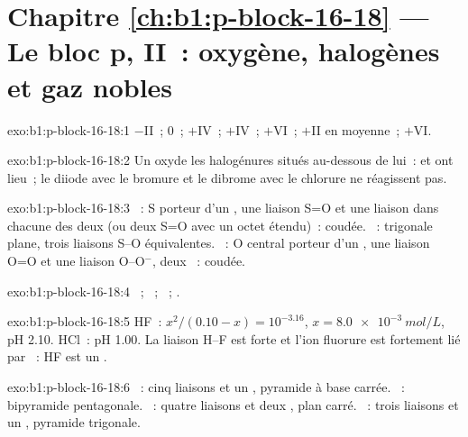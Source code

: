 \section*{Chapitre \ref{ch:b1:p-block-16-18} --- Le bloc p, II~: oxygène, halogènes et gaz nobles}

\begin{solution}{exo:b1:p-block-16-18:1}
 $-$II~;  0~;  $+$IV~;  $+$IV~; 
$+$VI~;  $+$II en moyenne~;  $+$VI.
\end{solution}

\begin{solution}{exo:b1:p-block-16-18:2}
Un  oxyde les halogénures situés au-dessous de lui~:
 et
 ont lieu~; le diiode avec le bromure et le
dibrome avec le chlorure ne réagissent pas.
\end{solution}

\begin{solution}{exo:b1:p-block-16-18:3}
~: S porteur d'un , une liaison S=O et une
liaison  dans chacune des deux  (ou deux
S=O avec un octet étendu)~: coudée.
~: trigonale plane, trois liaisons S--O équivalentes. ~:
O central porteur d'un , une liaison O=O et une liaison
O--O$^-$, deux ~: coudée.
\end{solution}

\begin{solution}{exo:b1:p-block-16-18:4}
~; ~;
~; .
\end{solution}

\begin{solution}{exo:b1:p-block-16-18:5}
HF~: $x^2/(0.10 - x) = 10^{-3.16}$, $x = \qty{8.0e-3}{mol/L}$, pH 2.10.
HCl~:
pH 1.00. La liaison H--F est forte et l'ion fluorure est fortement lié
par ~: HF est un .
\end{solution}

\begin{solution}{exo:b1:p-block-16-18:6}
~: cinq liaisons et un , pyramide à base
carrée. ~: bipyramide pentagonale. ~: quatre liaisons
et deux , plan carré. ~: trois liaisons et
un , pyramide trigonale.
\end{solution}

